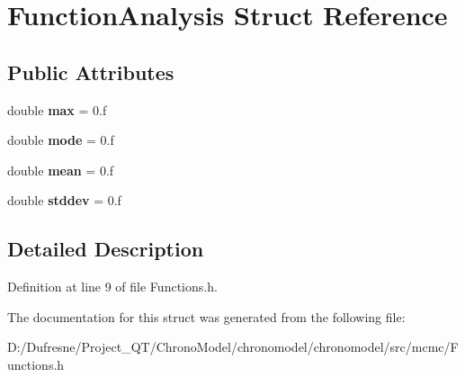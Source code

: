 \hypertarget{struct_function_analysis}{\section{Function\-Analysis Struct Reference}
\label{struct_function_analysis}
}
\subsection*{Public Attributes}
\begin{DoxyCompactItemize}
\item 
\hypertarget{struct_function_analysis_a3b4d565b10c61eca3a744e09f1f81870}{double {\bfseries max} = 0.f}\label{struct_function_analysis_a3b4d565b10c61eca3a744e09f1f81870}

\item 
\hypertarget{struct_function_analysis_af09a0cdce60356930733c9359ba924bc}{double {\bfseries mode} = 0.f}\label{struct_function_analysis_af09a0cdce60356930733c9359ba924bc}

\item 
\hypertarget{struct_function_analysis_afee0b8e1e185677b62e8cd2cf1704f64}{double {\bfseries mean} = 0.f}\label{struct_function_analysis_afee0b8e1e185677b62e8cd2cf1704f64}

\item 
\hypertarget{struct_function_analysis_a5ce96cb5f9ea5b023cf44b2ccad32625}{double {\bfseries stddev} = 0.f}\label{struct_function_analysis_a5ce96cb5f9ea5b023cf44b2ccad32625}

\end{DoxyCompactItemize}


\subsection{Detailed Description}


Definition at line 9 of file Functions.\-h.



The documentation for this struct was generated from the following file\-:\begin{DoxyCompactItemize}
\item 
D\-:/\-Dufresne/\-Project\-\_\-\-Q\-T/\-Chrono\-Model/chronomodel/chronomodel/src/mcmc/Functions.\-h\end{DoxyCompactItemize}
